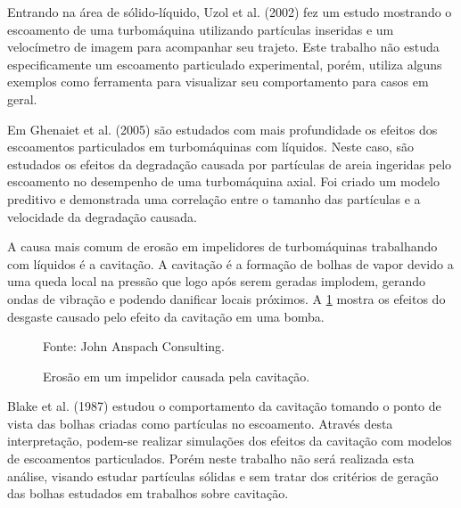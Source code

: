 Entrando na área de sólido-líquido, Uzol et al. (2002)\cite{Uzol-2002} fez um estudo mostrando o escoamento de uma turbomáquina utilizando partículas inseridas e um velocímetro de imagem para acompanhar seu trajeto.
Este trabalho não estuda especificamente um escoamento particulado experimental, porém, utiliza alguns exemplos como ferramenta para visualizar seu comportamento para casos em geral.

Em Ghenaiet et al. (2005)\cite{Ghenaiet-2005} são estudados com mais profundidade os efeitos dos escoamentos particulados em turbomáquinas com líquidos.
Neste caso, são estudados os efeitos da degradação causada por partículas de areia ingeridas pelo escoamento no desempenho de uma turbomáquina axial.
Foi criado um modelo preditivo e demonstrada uma correlação entre o tamanho das partículas e a velocidade da degradação causada.

A causa mais comum de erosão em impelidores de turbomáquinas trabalhando com líquidos é a cavitação.
A cavitação é a formação de bolhas de vapor devido a uma queda local na pressão que logo após serem geradas implodem, gerando ondas de vibração e podendo danificar locais próximos.
A \ref{JAC-Pump} mostra os efeitos do desgaste causado pelo efeito da cavitação em uma bomba.
\begin{figure}[H]
    \centering
     {\raggedleft \scriptsize Fonte: John Anspach Consulting\cite{JAC}.}
    \caption{Erosão em um impelidor causada pela cavitação.}
    \label{JAC-Pump}
\end{figure}

Blake et al. (1987)\cite{Blake-1987} estudou o comportamento da cavitação tomando o ponto de vista das bolhas criadas como partículas no escoamento.
Através desta interpretação, podem-se realizar simulações dos efeitos da cavitação com modelos de escoamentos particulados.
Porém neste trabalho não será realizada esta análise, visando estudar partículas sólidas e sem tratar dos critérios de geração das bolhas estudados em trabalhos sobre cavitação.

